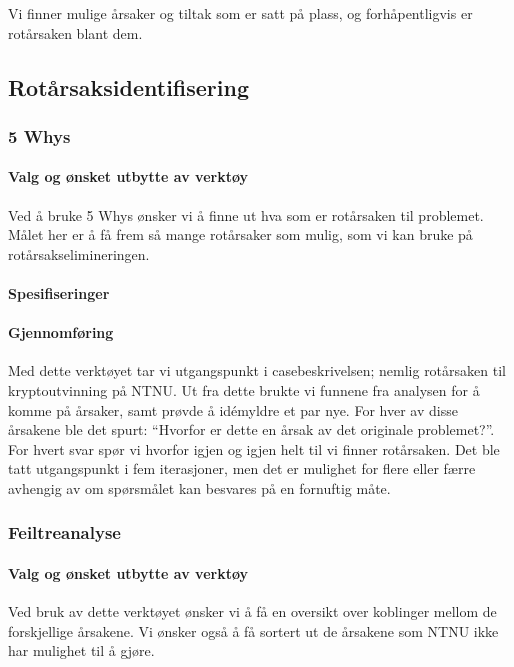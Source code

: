 Vi finner mulige årsaker og tiltak som er satt på plass, og forhåpentligvis er rotårsaken blant dem.


\subsection{Rotårsaksidentifisering}
\subsubsection{5 Whys}

\paragraph{Valg og ønsket utbytte av verktøy}
Ved å bruke 5 Whys ønsker  vi å finne ut hva som er rotårsaken til problemet. Målet her er å få frem så mange rotårsaker som mulig, som vi kan bruke på rotårsakselimineringen. 

\paragraph{Spesifiseringer}


\paragraph{Gjennomføring}
Med dette verktøyet tar vi utgangspunkt i casebeskrivelsen; nemlig rotårsaken til kryptoutvinning på NTNU. Ut fra dette brukte vi funnene fra analysen for å komme på årsaker, samt prøvde å idémyldre et par nye. For hver av disse årsakene ble det spurt: ``Hvorfor er dette en årsak av det originale problemet?''. For hvert svar spør vi hvorfor igjen og igjen helt til vi finner rotårsaken. Det ble tatt utgangspunkt i fem iterasjoner, men det er mulighet for flere eller færre avhengig av om spørsmålet kan besvares på en fornuftig måte. 


\subsubsection{Feiltreanalyse}
\paragraph{Valg og ønsket utbytte av verktøy}
Ved bruk av dette verktøyet ønsker vi å få en oversikt over koblinger mellom de forskjellige årsakene. Vi ønsker også å få sortert ut de årsakene som NTNU ikke har mulighet til å gjøre.

